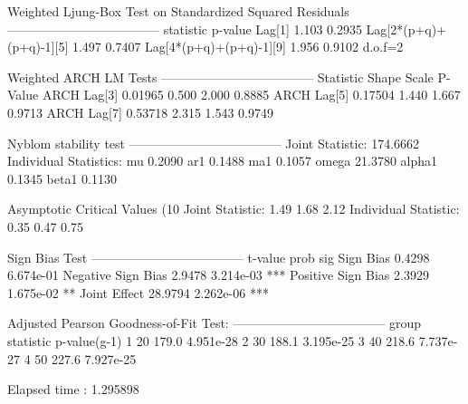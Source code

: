 \begin{Schunk}
\begin{Soutput}
Weighted Ljung-Box Test on Standardized Squared Residuals
------------------------------------
                        statistic p-value
Lag[1]                      1.103  0.2935
Lag[2*(p+q)+(p+q)-1][5]     1.497  0.7407
Lag[4*(p+q)+(p+q)-1][9]     1.956  0.9102
d.o.f=2

Weighted ARCH LM Tests
------------------------------------
            Statistic Shape Scale P-Value
ARCH Lag[3]   0.01965 0.500 2.000  0.8885
ARCH Lag[5]   0.17504 1.440 1.667  0.9713
ARCH Lag[7]   0.53718 2.315 1.543  0.9749

Nyblom stability test
------------------------------------
Joint Statistic:  174.6662
Individual Statistics:
mu      0.2090
ar1     0.1488
ma1     0.1057
omega  21.3780
alpha1  0.1345
beta1   0.1130

Asymptotic Critical Values (10%
Joint Statistic:     	 1.49 1.68 2.12
Individual Statistic:	 0.35 0.47 0.75

Sign Bias Test
------------------------------------
                   t-value      prob sig
Sign Bias           0.4298 6.674e-01
Negative Sign Bias  2.9478 3.214e-03 ***
Positive Sign Bias  2.3929 1.675e-02  **
Joint Effect       28.9794 2.262e-06 ***


Adjusted Pearson Goodness-of-Fit Test:
------------------------------------
  group statistic p-value(g-1)
1    20     179.0    4.951e-28
2    30     188.1    3.195e-25
3    40     218.6    7.737e-27
4    50     227.6    7.927e-25


Elapsed time : 1.295898
\end{Soutput}
\end{Schunk}

